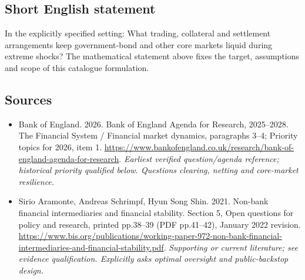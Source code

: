 \documentclass[11pt]{article}
\begin{document}
\subsection{Short English statement}
In the explicitly specified setting: What trading, collateral and settlement arrangements keep government-bond and other core markets liquid during extreme shocks? The mathematical statement above fixes the target, assumptions and scope of this catalogue formulation.

\subsection{Sources}
\begin{itemize}\raggedright
\item[\textnormal{[S1]}]\hypertarget{source:30007599:1}{} Bank of England. 2026. Bank of England Agenda for Research, 2025–2028. The Financial System / Financial market dynamics, paragraphs 3–4; Priority topics for 2026, item 1.
\url{https://www.bankofengland.co.uk/research/bank-of-england-agenda-for-research}.
{\small\textit{Earliest verified question/agenda reference; historical priority qualified below. Questions clearing, netting and core-market resilience.}}

\item[\textnormal{[S2]}]\hypertarget{source:30007599:2}{} Sirio Aramonte, Andreas Schrimpf, Hyun Song Shin. 2021. Non-bank financial intermediaries and financial stability. Section 5, Open questions for policy and research, printed pp.38–39 (PDF pp.41–42), January 2022 revision.
\url{https://www.bis.org/publications/working-paper-972-non-bank-financial-intermediaries-and-financial-stability.pdf}.
{\small\textit{Supporting or current literature; see evidence qualification. Explicitly asks optimal oversight and public-backstop design.}}
\end{itemize}
\end{document}
